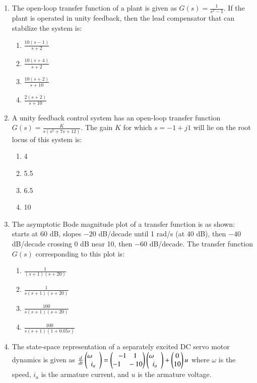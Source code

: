 \documentclass[journal,12pt,onecolumn]{IEEEtran}
\theoremstyle{remark}
\begin{document}
\begin{enumerate}
\item The open-loop transfer function of a plant is given as $G(s)=\frac{1}{s^2-1}$. If the plant is operated in unity feedback, then the lead compensator that can stabilize the system is: 
\hfill{}
\begin{multicols}{4}
\begin{enumerate}
    \item $\frac{10(s-1)}{s+2}$
    \item $\frac{10(s+4)}{s+2}$
    \item $\frac{10(s+2)}{s+10}$
    \item $\frac{2(s+2)}{s+10}$
\end{enumerate}
\end{multicols}

\item A unity feedback control system has an open-loop transfer function
$
G(s)=\frac{K}{s(s^2+7s+12)}.
$
The gain $K$ for which $s=-1+j1$ will lie on the root locus of this system is:
\hfill{}
\begin{multicols}{4}
\begin{enumerate}
    \item 4
    \item 5.5
    \item 6.5
    \item 10
\end{enumerate}
\end{multicols}

\item The asymptotic Bode magnitude plot of a transfer function is as shown: starts at 60 dB, slopes $-20$ dB/decade until 1 rad/s (at 40 dB), then $-40$ dB/decade crossing 0 dB near 10, then $-60$ dB/decade. The transfer function $G(s)$ corresponding to this plot is: 
\hfill{}
\begin{multicols}{4}
\begin{enumerate}
    \item $\frac{1}{(s+1)(s+20)}$
    \item $\frac{1}{s(s+1)(s+20)}$
    \item $\frac{100}{s(s+1)(s+20)}$
    \item $\frac{100}{s(s+1)(1+0.05s)}$
\end{enumerate}
\end{multicols}

 \item
    The state-space representation of a separately excited DC servo motor dynamics is given as
    $
    \frac{d}{dt}
    \begin{pmatrix}
        \omega\quad\\
        i_a
    \end{pmatrix}
    =
    \begin{pmatrix}
        -1\quad 1\\
        -1\quad -10
    \end{pmatrix}
    \begin{pmatrix}
        \omega\quad\\
        i_a
    \end{pmatrix}
    +
    \begin{pmatrix}
        0\\
        10
    \end{pmatrix}
    u
    $
    \quad where $\omega$ is the speed, $i_a$ is the armature current, and $u$ is the armature voltage. \quad


\end{enumerate}
\end{document}
